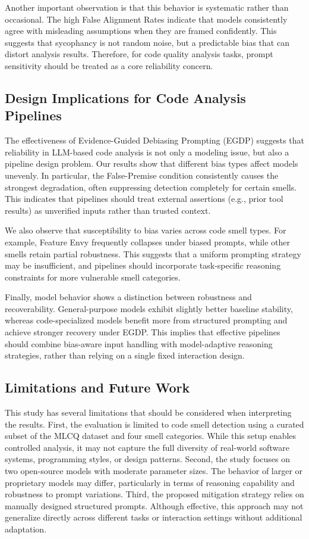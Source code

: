 \documentclass[sigconf,review,anonymous]{acmart}
\begin{document}
Another important observation is that this behavior is systematic rather than occasional. The high False Alignment Rates indicate that models consistently agree with misleading assumptions when they are framed confidently. This suggests that sycophancy is not random noise, but a predictable bias that can distort analysis results. Therefore, for code quality analysis tasks, prompt sensitivity should be treated as a core reliability concern. 

\subsection{Design Implications for Code Analysis Pipelines}

The effectiveness of Evidence-Guided Debiasing Prompting (EGDP) suggests that reliability in LLM-based code analysis is not only a modeling issue, but also a pipeline design problem. Our results show that different bias types affect models unevenly. In particular, the False-Premise condition consistently causes the strongest degradation, often suppressing detection completely for certain smells. This indicates that pipelines should treat external assertions (e.g., prior tool results) as unverified inputs rather than trusted context.

We also observe that susceptibility to bias varies across code smell types. For example, Feature Envy frequently collapses under biased prompts, while other smells retain partial robustness. This suggests that a uniform prompting strategy may be insufficient, and pipelines should incorporate task-specific reasoning constraints for more vulnerable smell categories.

Finally, model behavior shows a distinction between robustness and recoverability. General-purpose models exhibit slightly better baseline stability, whereas code-specialized models benefit more from structured prompting and achieve stronger recovery under EGDP. This implies that effective pipelines should combine bias-aware input handling with model-adaptive reasoning strategies, rather than relying on a single fixed interaction design.

\subsection{Limitations and Future Work}

This study has several limitations that should be considered when interpreting the results. First, the evaluation is limited to code smell detection using a curated subset of the MLCQ dataset and four smell categories. While this setup enables controlled analysis, it may not capture the full diversity of real-world software systems, programming styles, or design patterns. Second, the study focuses on two open-source models with moderate parameter sizes. The behavior of larger or proprietary models may differ, particularly in terms of reasoning capability and robustness to prompt variations. Third, the proposed mitigation strategy relies on manually designed structured prompts. Although effective, this approach may not generalize directly across different tasks or interaction settings without additional adaptation.
\end{document}
